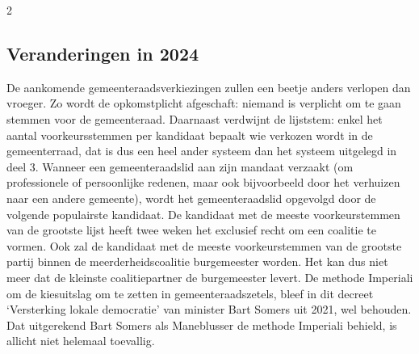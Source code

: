\begin{multicols}{2}
\subsection{Veranderingen in 2024}
De aankomende gemeenteraadsverkiezingen zullen een beetje anders verlopen dan vroeger. Zo wordt de opkomstplicht afgeschaft: niemand is verplicht om te gaan stemmen voor de gemeenteraad. Daarnaast verdwijnt de lijststem: enkel het aantal voorkeursstemmen per kandidaat bepaalt wie verkozen wordt in de gemeenterraad, dat is dus een heel ander systeem dan het systeem uitgelegd in deel 3. Wanneer een gemeenteraadslid aan zijn mandaat verzaakt (om professionele of persoonlijke redenen, maar ook bijvoorbeeld door het verhuizen naar een andere gemeente), wordt het gemeenteraadslid opgevolgd door de volgende populairste kandidaat. De kandidaat met de meeste voorkeurstemmen van de grootste lijst heeft twee weken het exclusief recht om een coalitie te vormen. Ook zal de kandidaat met de meeste voorkeurstemmen van de grootste partij binnen de meerderheidscoalitie burgemeester worden. Het kan dus niet meer dat de kleinste coalitiepartner de burgemeester levert. De methode Imperiali om de kiesuitslag om te zetten in gemeenteraadszetels, bleef in dit decreet `Versterking lokale democratie' van minister Bart Somers uit 2021, wel behouden. Dat uitgerekend Bart Somers als Maneblusser de methode Imperiali behield, is allicht niet helemaal toevallig.
\end{multicols}


